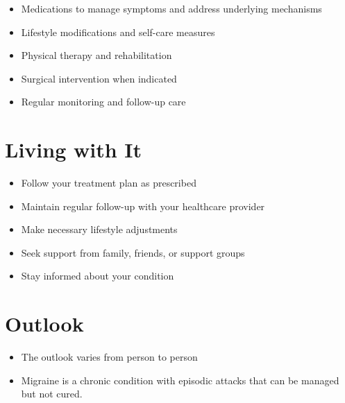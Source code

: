 \begin{itemize}[noitemsep]
  \item Medications to manage symptoms and address underlying mechanisms
  \item Lifestyle modifications and self-care measures
  \item Physical therapy and rehabilitation
  \item Surgical intervention when indicated
  \item Regular monitoring and follow-up care
\end{itemize}
\section{Living with It}
\begin{itemize}[noitemsep]
  \item Follow your treatment plan as prescribed
  \item Maintain regular follow-up with your healthcare provider
  \item Make necessary lifestyle adjustments
  \item Seek support from family, friends, or support groups
  \item Stay informed about your condition
\end{itemize}
\section{Outlook}
\begin{itemize}[noitemsep]
  \item The outlook varies from person to person
  \item Migraine is a chronic condition with episodic attacks that can be managed but not cured.
\end{itemize}
